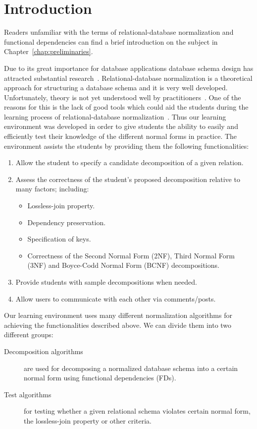 \chapter{Introduction}
\label{chap:introduction}
Readers unfamiliar with the terms of relational-database normalization and 
functional dependencies can find a brief introduction on the subject in
Chapter~\ref{chap:preliminaries}. 

Due to its great importance for database applications database schema design has
attracted substantial research~\cite{p1}. Relational-database normalization is a 
theoretical approach for structuring a database schema and it is very well developed. 
Unfortunately, theory is not yet understood well by practitioners~\cite{p1}.
One of the reasons for this is the lack of good tools which could aid the students 
during the learning process of relational-database normalization~\cite{p8}. 
Thus our learning environment was developed in order to give students the ability to 
easily and efficiently test
their knowledge of the different normal forms in practice. The environment assists the students by 
providing them the following functionalities:

\begin{enumerate}
	\item Allow the student to specify a candidate decomposition of a given relation.
	\item Assess the correctness of the student's proposed decomposition relative to many factors; including:
		\begin{itemize}
			\item Lossless-join property.
			\item Dependency preservation.
			\item Specification of keys.
			\item Correctness of the Second Normal Form (2NF), Third Normal Form (3NF) and
			 Boyce-Codd Normal Form (BCNF) decompositions.
		\end{itemize}
	\item Provide students with sample decompositions when needed. 
	\item Allow users to communicate with each other via comments/posts.
\end{enumerate}

Our learning environment uses many different normalization 
algorithms for achieving the functionalities described above. 
We can divide them into two different groups:

\begin{description}
	\item[Decomposition algorithms] are used for decomposing a normalized database 
	schema into a certain normal form using functional dependencies (FDs).
	\item[Test algorithms] for testing whether a given relational schema
	violates certain normal form, the lossless-join property or other criteria.
\end{description}

